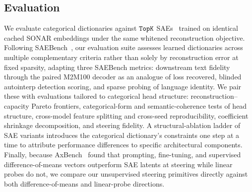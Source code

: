 \subsection{Evaluation}
We evaluate categorical dictionaries against $\mathop{\mathtt{TopK}}\limits$ SAEs~\cite{gao2024}
trained on identical cached SONAR embeddings under the same whitened
reconstruction objective. Following SAEBench~\cite{karvonen2025}, our
evaluation suite assesses learned dictionaries across multiple
complementary criteria rather than solely by reconstruction error at
fixed sparsity, adapting three SAEBench metrics: downstream text fidelity
through the paired M2M100 decoder as an analogue of loss recovered,
blinded autointerp detection scoring, and sparse probing of language
identity. We pair these with evaluations tailored to categorical head
structure: reconstruction--capacity Pareto frontiers, categorical-form
and semantic-coherence tests of head structure, cross-model feature
splitting and cross-seed reproducibility, coefficient shrinkage
decomposition, and steering fidelity. A structural-ablation ladder of SAE
variants introduces the categorical dictionary's constraints one step at a
time to attribute performance differences to specific architectural
components. Finally, because AxBench~\cite{wu2025axbenchsteeringllmssimple} found
that prompting, fine-tuning, and supervised difference-of-means vectors
outperform SAE latents at steering while linear probes do not, we compare
our unsupervised steering primitives directly against both
difference-of-means and linear-probe directions.
